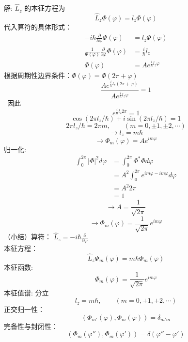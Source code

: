 \begin{frame} [allowframebreaks=]
    \alert{解:} $\hat{L}_z$ 的本征方程为 
    $$\hat{L}_z\Phi(\varphi)=l_z\Phi(\varphi)$$
    代入算符的具体形式：
    \begin{equation*}
        \begin{split}
            -i \hbar \frac{\partial}{\partial \varphi}\Phi(\varphi)&=l_z\Phi(\varphi) \\
            \frac{1}{\Phi(\varphi)}\frac{\partial}{\partial \varphi}\Phi(\varphi)&=\frac{i}{\hbar}l_z \\
            \Phi(\varphi)&=A e ^{\frac{i}{\hbar}l_z\varphi}
        \end{split} 
    \end{equation*}
     根据周期性边界条件：$\Phi(\varphi)=\Phi(2\pi+\varphi)$\\
    \begin{equation*}
        \frac{A e ^{\frac{i}{\hbar}l_z(2\pi+\varphi)}}{A e ^{\frac{i}{\hbar}l_z\varphi}}=1
    \end{equation*} 
     因此
    \begin{equation*}
        e ^{\frac{i}{\hbar}l_z2\pi}=1
    \end{equation*} 
    $$
    \cos \left(2 \pi l_{z} / \hbar\right)+i \sin \left(2 \pi l_{z} / \hbar\right)=1
    $$
    $$ 2 \pi l_{z} / \hbar=2\pi m, \qquad (m=0,\pm 1,  \pm 2, \cdots) $$
    $$\to l_z=m\hbar$$
    $$\to \Phi_m(\varphi)=Ae^{im\varphi}$$
    归一化:
    \begin{equation*}
        \begin{split}
            \int_0 ^{2\pi} |\Phi|^2 d \varphi &= \int_0 ^{2\pi} \Phi^*\Phi  d \varphi \\
            &= A^2 \int_0 ^{2\pi} e^{im\varphi-im\varphi} d \varphi \\
            &= A^2 2\pi \\
            &= 1
        \end{split}   
    \end{equation*}
    $$ \to A= \frac{1}{\sqrt{2\pi}} $$
    $$ \to \Phi_m(\varphi)=\frac{1}{\sqrt{2\pi}}e^{im\varphi}$$
    （小结）算符：  $\hat{L}_{z}=-i \hbar \frac{\partial}{\partial \varphi}$ \\
    本征方程： $$\hat{L}_z\Phi_m(\varphi)=m\hbar \Phi_m (\varphi)$$
    本征函数: $$ \Phi_m(\varphi)=\frac{1}{\sqrt{2\pi}}e^{im\varphi}$$
    本征值谱:  分立
        $$ l_z=m\hbar, \qquad (m=0,\pm 1,  \pm 2, \cdots) $$
    正交归一性：
        $$ (\Phi_{m'}(\varphi), \Phi_m(\varphi)) =\delta_{m'm}$$
    完备性与封闭性：$$ (\Phi_m(\varphi''), \Phi_m(\varphi')) =\delta(\varphi''-\varphi')$$
\end{frame} 

